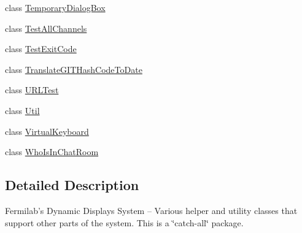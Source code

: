 \begin{DoxyCompactItemize}
\item 
class \hyperlink{classgov_1_1fnal_1_1ppd_1_1dd_1_1util_1_1TemporaryDialogBox}{Temporary\-Dialog\-Box}
\item 
class \hyperlink{classgov_1_1fnal_1_1ppd_1_1dd_1_1util_1_1TestAllChannels}{Test\-All\-Channels}
\item 
class \hyperlink{classgov_1_1fnal_1_1ppd_1_1dd_1_1util_1_1TestExitCode}{Test\-Exit\-Code}
\item 
class \hyperlink{classgov_1_1fnal_1_1ppd_1_1dd_1_1util_1_1TranslateGITHashCodeToDate}{Translate\-G\-I\-T\-Hash\-Code\-To\-Date}
\item 
class \hyperlink{classgov_1_1fnal_1_1ppd_1_1dd_1_1util_1_1URLTest}{U\-R\-L\-Test}
\item 
class \hyperlink{classgov_1_1fnal_1_1ppd_1_1dd_1_1util_1_1Util}{Util}
\item 
class \hyperlink{classgov_1_1fnal_1_1ppd_1_1dd_1_1util_1_1VirtualKeyboard}{Virtual\-Keyboard}
\item 
class \hyperlink{classgov_1_1fnal_1_1ppd_1_1dd_1_1util_1_1WhoIsInChatRoom}{Who\-Is\-In\-Chat\-Room}
\end{DoxyCompactItemize}


\subsection{Detailed Description}
Fermilab's Dynamic Displays System -- Various helper and utility classes that support other parts of the system. This is a \char`\"{}catch-\/all\char`\"{} package.